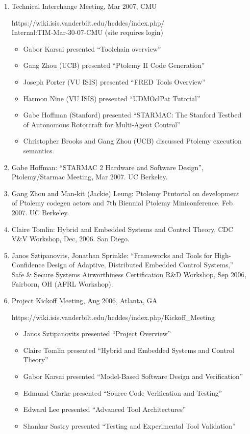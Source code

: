 \begin{enumerate}
\item Technical Interchange Meeting, Mar 2007, CMU 

https://wiki.isis.vanderbilt.edu/hcddes/index.php/ \\
\indent Internal:TIM-Mar-30-07-CMU (site requires login)

\begin{itemize}
\item Gabor Karsai presented ``Toolchain overview''
\item Gang Zhou (UCB) presented ``Ptolemy II Code Generation''
\item Joseph Porter (VU ISIS) presented ``FRED Tools Overview''
\item Harmon Nine (VU ISIS) presented ``UDMOclPat Tutorial''
\item Gabe Hoffman (Stanford) presented ``STARMAC: The Stanford Testbed of Autonomous Rotorcraft for Multi-Agent Control''
\item Christopher Brooks and Gang Zhou (UCB) discussed Ptolemy execution semantics.
\end{itemize}

\item Gabe Hoffman: ``STARMAC 2 Hardware and Software Design'', Ptolemy/Starmac Meeting, Mar 2007. UC Berkeley.

\item Gang Zhou and Man-kit (Jackie) Leung: Ptolemy Ptutorial on development of Ptolemy codegen actors and 7th Biennial Ptolemy Miniconference. Feb 2007. UC Berkeley.

\item Claire Tomlin: Hybrid and Embedded Systems and Control Theory, CDC V\&V Workshop, Dec, 2006. San Diego.

\item Janos Sztipanovits, Jonathan Sprinkle: ``Frameworks and Tools for High-Confidence Design of Adaptive, Distributed Embedded Control Systems,'' Safe \& Secure Systems Airworthiness Certification R\&D Workshop, Sep 2006, Fairborn, OH (AFRL Workshop).

\item Project Kickoff Meeting, Aug 2006, Atlanta, GA 

https://wiki.isis.vanderbilt.edu/hcddes/index.php/Kickoff\_Meeting

\begin{itemize}
\item Janos Sztipanovits presented ``Project Overview''
\item Claire Tomlin presented ``Hybrid and Embedded Systems and Control Theory''
\item Gabor Karsai presented ``Model-Based Software Design and Verification''
\item Edmund Clarke presented ``Source Code Verification and Testing''
\item Edward Lee presented ``Advanced Tool Architectures''
\item Shankar Sastry presented ``Testing and Experimental Tool Validation''
\end{itemize}


\end{enumerate}
